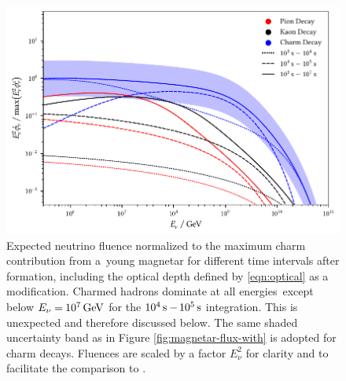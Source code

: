\begin{figure}[H]
	\centering
	\includegraphics{../plots/build/magnetar_integrated_neutrino_spectrum_with.pdf}
	\caption[Magnetar $\nu \kern+0.5pt$ fluence compared to $c$ decay with optical depth.]
			{Expected neutrino fluence normalized to the maximum charm contribution from a~young magnetar for different time
			 intervals after formation, including the optical depth defined by \eqref{eqn:optical} as a modification.
			 Charmed hadrons dominate at all energies~except below $E_\nu = \kern-0.5pt \qty{e7}{\giga\electronvolt}$ for the
			 $\qty{e4}{\second} - \kern-1.0pt \qty{e5}{\second}$ integration. This is unexpected and therefore discussed below.
			 The same shaded uncertainty band as in Figure \ref{fig:magnetar-flux-with} is adopted for charm decays.
			 Fluences are scaled by a factor $E_\nu^2$ for clarity and to facilitate the comparison to \cite{Carpio_2020}.}
	\label{fig:magnetar-fluence-with}
\end{figure}
